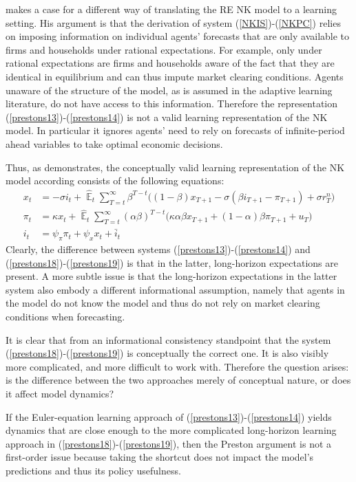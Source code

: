 \documentclass[11pt]{article}
\renewcommand{\[}{\begin{equation}}
\renewcommand{\]}{\end{equation}}
\DeclareMathOperator{\E}{\mathbb{E}}
\begin{document}
\cite{preston2005} makes a case for a different way of translating the RE NK model to a learning setting. His argument is that the derivation of system (\ref{NKIS})-(\ref{NKPC}) relies on imposing information on individual agents' forecasts that are only available to firms and households under rational expectations. For example, only under rational expectations are firms and households aware of the fact that they are identical in equilibrium and can thus impute market clearing conditions. Agents unaware of the structure of the model, as is assumed in the adaptive learning literature, do not have access to this information. Therefore the representation (\ref{prestons13})-(\ref{prestons14}) is not a valid learning representation of the NK model. In particular it ignores agents' need to rely on forecasts of infinite-period ahead variables to take optimal economic decisions.

Thus, as \cite{preston2005} demonstrates, the conceptually valid learning representation of the NK model according consists of the following equations:
\begin{align}
x_t &=  -\sigma i_t +\hat{\E}_t \sum_{T=t}^{\infty} \beta^{T-t }\big( (1-\beta)x_{T+1} - \sigma(\beta i_{T+1} - \pi_{T+1}) +\sigma r_T^n \big)  \label{prestons18}  \\
\pi_t &= \kappa x_t +\hat{\E}_t \sum_{T=t}^{\infty} (\alpha\beta)^{T-t }\big( \kappa \alpha \beta x_{T+1} + (1-\alpha)\beta \pi_{T+1} + u_T\big) \label{prestons19}  \\
i_t &= \psi_{\pi}\pi_t + \psi_{x} x_t + \bar{i}_t 
\end{align}
Clearly, the difference between systems (\ref{prestons13})-(\ref{prestons14}) and (\ref{prestons18})-(\ref{prestons19}) is that in the latter, long-horizon expectations are present. A more subtle issue is that the long-horizon expectations in the latter system also embody a different informational assumption, namely that agents in the model do not know the model and thus do not rely on market clearing conditions when forecasting.

It is clear that from an informational consistency standpoint that the system (\ref{prestons18})-(\ref{prestons19}) is conceptually the correct one. It is also visibly more complicated, and more difficult to work with. Therefore the question arises: is the difference between the two approaches merely of conceptual nature, or does it affect model dynamics? 

If the Euler-equation learning approach of (\ref{prestons13})-(\ref{prestons14}) yields dynamics that are close enough to the more complicated long-horizon learning approach in (\ref{prestons18})-(\ref{prestons19}), then the Preston argument is not a first-order issue because taking the shortcut does not impact the model's predictions and thus its policy usefulness. 
  
\end{document}
